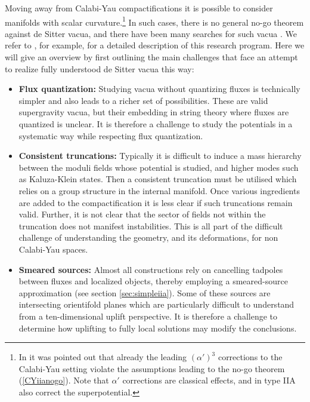 \documentclass[11pt,a4paper]{article}
\numberwithin{equation}{section}
\numberwithin{table}{section}\setlength{\multlinegap}{25pt}
\begin{document}
{Moving away from Calabi-Yau compactifications it is possible to consider manifolds with scalar curvature.\footnote{In \cite{Palti:2008mg} it was pointed out that already the leading $\left(\alpha'\right)^3$ corrections to the Calabi-Yau setting violate the assumptions leading to the no-go theorem (\ref{CYiianogo}). Note that $\alpha'$ corrections are classical effects, and in type IIA also correct the superpotential.}  In such cases, there is no general no-go theorem against de Sitter vacua, and there have been many searches for such vacua \cite{Silverstein:2007ac,Covi:2008ea,Haque:2008jz,Caviezel:2008tf,Flauger:2008ad,Danielsson:2009ff,deCarlos:2009fq,Caviezel:2009tu,Dibitetto:2010rg,Wrase:2010ew,Danielsson:2010bc,Blaback:2010sj,Danielsson:2011au,Shiu:2011zt,Burgess:2011rv,VanRiet:2011yc,Danielsson:2012by,Danielsson:2012et,Gautason:2013zw,Kallosh:2014oja,Junghans:2016uvg,Andriot:2016xvq,Junghans:2016abx,Andriot:2017jhf,Andriot:2018ept,Roupec:2018mbn,Junghans:2018gdb,Banlaki:2018ayh,Cordova:2018dbb,Cribiori:2019clo,Berglund:2019pxr,Blaback:2019zig,Blaback:2018hdo,Andriot:2019wrs}. We refer to \cite{Danielsson:2018ztv}, for example, for a detailed description of this research program. Here we will give an overview by first outlining the main challenges that face an attempt to realize fully understood de Sitter vacua this way:
\begin{itemize}
\item {\bf Flux quantization:} Studying vacua without quantizing fluxes is technically simpler and also leads to a richer set of possibilities. These are valid supergravity vacua, but their embedding in string theory where fluxes are quantized is unclear. It is therefore a challenge to study the potentials in a systematic way while respecting flux quantization.
\item {\bf Consistent truncations:} Typically it is difficult to induce a mass hierarchy between the moduli fields whose potential is studied, and higher modes such as Kaluza-Klein states. Then a consistent truncation must be utilised which relies on a group structure in the internal manifold. Once various ingredients are added to the compactification it is less clear if such truncations remain valid. Further, it is not clear that the sector of fields not within the truncation does not manifest instabilities. This is all part of the difficult challenge of understanding the geometry, and its deformations, for non Calabi-Yau spaces.
\item {\bf Smeared sources:}  Almost all constructions rely on cancelling tadpoles between fluxes and localized objects, thereby employing a smeared-source approximation (see section \ref{sec:simpleiia}). Some of these sources are intersecting orientifold planes which are particularly difficult to understand from a ten-dimensional uplift perspective. It is therefore a challenge to determine how uplifting to fully local solutions may modify the conclusions.

\end{itemize}}
\end{document}
